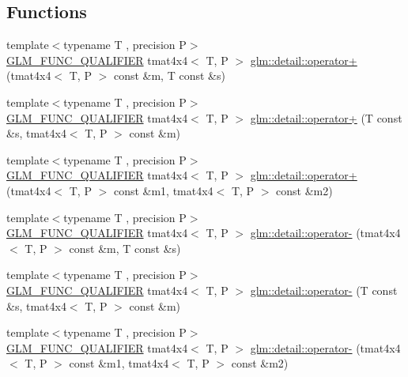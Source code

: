 \subsection*{Functions}
\begin{DoxyCompactItemize}
\item 
{\footnotesize template$<$typename T , precision P$>$ }\\\hyperlink{setup_8hpp_a33fdea6f91c5f834105f7415e2a64407}{G\+L\+M\+\_\+\+F\+U\+N\+C\+\_\+\+Q\+U\+A\+L\+I\+F\+I\+ER} tmat4x4$<$ T, P $>$ \hyperlink{namespaceglm_1_1detail_a036a1582b971af3eb75999f4be626788}{glm\+::detail\+::operator+} (tmat4x4$<$ T, P $>$ const \&m, T const \&s)
\item 
{\footnotesize template$<$typename T , precision P$>$ }\\\hyperlink{setup_8hpp_a33fdea6f91c5f834105f7415e2a64407}{G\+L\+M\+\_\+\+F\+U\+N\+C\+\_\+\+Q\+U\+A\+L\+I\+F\+I\+ER} tmat4x4$<$ T, P $>$ \hyperlink{namespaceglm_1_1detail_a35bc4c77241420d7b1a022da0cb51ec4}{glm\+::detail\+::operator+} (T const \&s, tmat4x4$<$ T, P $>$ const \&m)
\item 
{\footnotesize template$<$typename T , precision P$>$ }\\\hyperlink{setup_8hpp_a33fdea6f91c5f834105f7415e2a64407}{G\+L\+M\+\_\+\+F\+U\+N\+C\+\_\+\+Q\+U\+A\+L\+I\+F\+I\+ER} tmat4x4$<$ T, P $>$ \hyperlink{namespaceglm_1_1detail_abfedb6a54a4f930abebe603209e60172}{glm\+::detail\+::operator+} (tmat4x4$<$ T, P $>$ const \&m1, tmat4x4$<$ T, P $>$ const \&m2)
\item 
{\footnotesize template$<$typename T , precision P$>$ }\\\hyperlink{setup_8hpp_a33fdea6f91c5f834105f7415e2a64407}{G\+L\+M\+\_\+\+F\+U\+N\+C\+\_\+\+Q\+U\+A\+L\+I\+F\+I\+ER} tmat4x4$<$ T, P $>$ \hyperlink{namespaceglm_1_1detail_a11c94847c2ead7c4ac25d8c37dea1e49}{glm\+::detail\+::operator-\/} (tmat4x4$<$ T, P $>$ const \&m, T const \&s)
\item 
{\footnotesize template$<$typename T , precision P$>$ }\\\hyperlink{setup_8hpp_a33fdea6f91c5f834105f7415e2a64407}{G\+L\+M\+\_\+\+F\+U\+N\+C\+\_\+\+Q\+U\+A\+L\+I\+F\+I\+ER} tmat4x4$<$ T, P $>$ \hyperlink{namespaceglm_1_1detail_a448f77fd8404d3c543e17e9ebe3cdf7c}{glm\+::detail\+::operator-\/} (T const \&s, tmat4x4$<$ T, P $>$ const \&m)
\item 
{\footnotesize template$<$typename T , precision P$>$ }\\\hyperlink{setup_8hpp_a33fdea6f91c5f834105f7415e2a64407}{G\+L\+M\+\_\+\+F\+U\+N\+C\+\_\+\+Q\+U\+A\+L\+I\+F\+I\+ER} tmat4x4$<$ T, P $>$ \hyperlink{namespaceglm_1_1detail_ac56dae61b006ad1a335e11bcb6871b46}{glm\+::detail\+::operator-\/} (tmat4x4$<$ T, P $>$ const \&m1, tmat4x4$<$ T, P $>$ const \&m2)

\end{DoxyCompactItemize}
